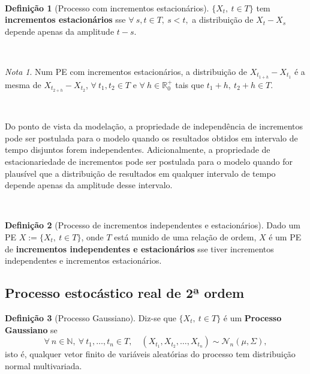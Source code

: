 \documentclass[
  11pt,
  a4paper,
]{book}
\theoremstyle{definition}
\newtheorem{definition}{Definição}[chapter]
\theoremstyle{definition}
\theoremstyle{definition}
\theoremstyle{definition}
\theoremstyle{remark}
\newtheorem*{remark}{Nota }
\begin{document}
\(\,\)

\begin{definition}[Processo com incrementos estacionários]
\(\{X_t, ~ t \in T\}\) tem \textbf{incrementos estacionários} sse \(\forall ~s, t \in T, ~s<t,\) a
distribuição de \(X_t-X_s\) depende apenas da amplitude \(t-s\).
\end{definition}

\(\,\)

\begin{remark}
Num PE com incrementos estacionários, a distribuição de \(X_{t_{1+h}}-X_{t_1}\) é a mesma de
\(X_{t_{2+h}}-X_{t_2}\), \(\forall ~ t_1,t_2 \in T\) e \(\forall ~ h \in \mathbb{R}_0^+\) tais que \(t_1+h, ~t_2+h \in T.\)
\end{remark}

\(\,\)

Do ponto de vista da modelação, a propriedade de independência de incrementos pode ser
postulada para o modelo quando os resultados obtidos em intervalo de tempo disjuntos forem
independentes. Adicionalmente, a propriedade de estacionariedade de incrementos pode ser
postulada para o modelo quando for plausível que a distribuição de resultados em qualquer
intervalo de tempo depende apenas da amplitude desse intervalo.

\(\,\)

\begin{definition}[Processo de incrementos independentes e estacionários]
Dado um PE \(X:=\{X_t, ~ t \in T\}\), onde \(T\) está munido de uma relação de ordem, \(X\) é um PE
de \textbf{incrementos independentes e estacionários} sse tiver incrementos independentes e
incrementos estacionários.
\end{definition}

\subsection{Processo estocástico real de 2ª ordem}\label{processo-estocastico-real-de-2-ordem}

\begin{definition}[Processo Gaussiano]
Diz-se que \(\{X_t, ~t \in T\}\) é um \textbf{Processo Gaussiano} se
\[
\forall ~n \in \mathbb{N},~ \forall ~t_1, \ldots, t_n \in T, \quad (X_{t_1}, X_{t_2}, \ldots, X_{t_n}) \sim \mathcal{N}_n(\mu, \Sigma),
\]
isto é, qualquer vetor finito de variáveis aleatórias do processo tem distribuição normal multivariada.
\end{definition}
\end{document}
